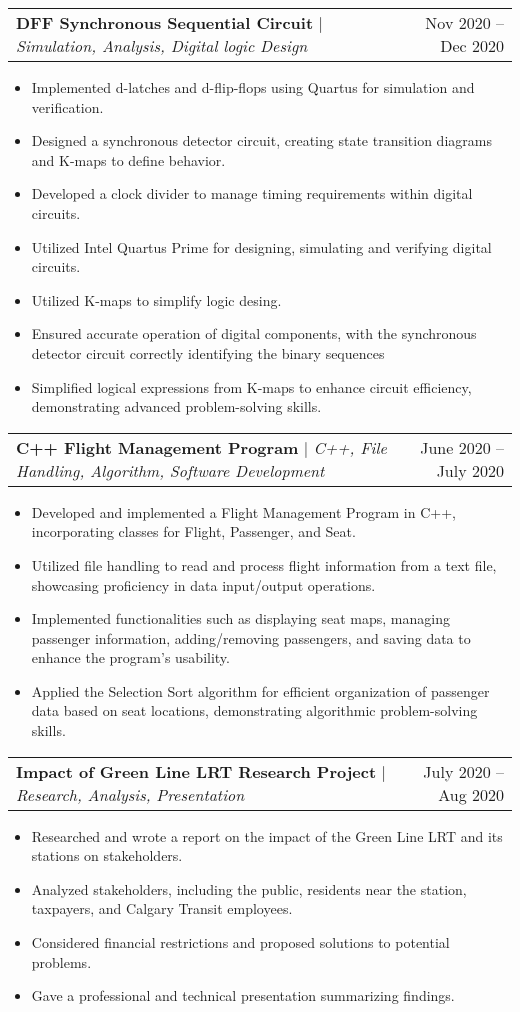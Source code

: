 \documentclass[A4,10pt]{article}
\makeatletter
\newcommand{\resumeItem}[1]{
  \item\small{
    {#1 \vspace{-2pt}}
  }
}
\newcommand{\resumeProjectHeading}[2]{
    \item
    \begin{tabular*}{0.97\textwidth}{l@{\extracolsep{\fill}}r}
      \small#1 & #2 \\
    \end{tabular*}\vspace{-7pt}
}
\newcommand{\resumeItemListStart}{\begin{itemize}}
\newcommand{\resumeItemListEnd}{\end{itemize}\vspace{-5pt}}
\makeatother
\begin{document}
        
        \resumeProjectHeading
        {\textbf{DFF Synchronous Sequential Circuit} $|$ \emph{Simulation, Analysis, Digital logic Design}}{Nov 2020 -- Dec 2020}
        \resumeItemListStart
          \resumeItem{Implemented d-latches and d-flip-flops using Quartus for simulation and verification.}
          \resumeItem{Designed a synchronous detector circuit, creating state transition diagrams and K-maps to define behavior.}
          \resumeItem{Developed a clock divider to manage timing requirements within digital circuits.}
          \resumeItem{Utilized Intel Quartus Prime for designing, simulating and verifying digital circuits.}
          \resumeItem{Utilized K-maps to simplify logic desing.}
          \resumeItem{Ensured accurate operation of digital components, with the synchronous detector circuit correctly identifying the binary sequences}
          \resumeItem{Simplified logical expressions from K-maps to enhance circuit efficiency, demonstrating advanced problem-solving skills.}
        \resumeItemListEnd

        \resumeProjectHeading
        {\textbf{C++ Flight Management Program} $|$ \emph{C++, File Handling, Algorithm, Software Development}}{June 2020 -- July 2020}
        \resumeItemListStart
          \resumeItem{Developed and implemented a Flight Management Program in C++, incorporating classes for Flight, Passenger, and Seat.}
          \resumeItem{Utilized file handling to read and process flight information from a text file, showcasing proficiency in data input/output operations.}
          \resumeItem{Implemented functionalities such as displaying seat maps, managing passenger information, adding/removing passengers, and saving data to enhance the program's usability.}
          \resumeItem{Applied the Selection Sort algorithm for efficient organization of passenger data based on seat locations, demonstrating algorithmic problem-solving skills.}
        \resumeItemListEnd
  
        \resumeProjectHeading
        {\textbf{Impact of Green Line LRT Research Project} $|$ \emph{Research, Analysis, Presentation}}{July 2020 -- Aug 2020}
        \resumeItemListStart
          \resumeItem{Researched and wrote a report on the impact of the Green Line LRT and its stations on stakeholders.}
          \resumeItem{Analyzed stakeholders, including the public, residents near the station, taxpayers, and Calgary Transit employees.}
          \resumeItem{Considered financial restrictions and proposed solutions to potential problems.}
          \resumeItem{Gave a professional and technical presentation summarizing findings.}
        \resumeItemListEnd
        
\end{document}
